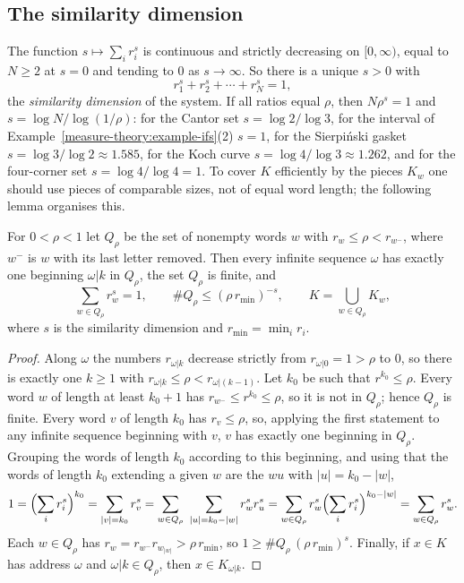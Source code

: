 \subsection{The similarity dimension}\label{measure-theory:subsection-similarity-dimension}

The function $s \mapsto \sum_ir_i^s$ is continuous and strictly decreasing on $[0, \infty)$, equal to $N \geq 2$ at $s = 0$ and tending to $0$ as $s \to \infty$. So there is a unique $s > 0$ with
\begin{equation}\label{measure-theory:equation-moran}
r_1^s + r_2^s + \cdots + r_N^s = 1,
\end{equation}
the \emph{similarity dimension} of the system. If all ratios equal $\rho$, then $N\rho^s = 1$ and $s = \log N/\log(1/\rho)$: for the Cantor set $s = \log 2/\log 3$, for the interval of
Example~\ref{measure-theory:example-ifs}(2) $s = 1$, for the Sierpi\'nski gasket $s = \log 3/\log 2 \approx 1.585$, for the Koch curve $s = \log 4/\log 3 \approx 1.262$, and for the
four-corner set $s = \log 4/\log 4 = 1$. To cover $K$ efficiently by the pieces $K_w$ one should use pieces of comparable sizes, not of equal word length; the following lemma organises this.

\begin{lemma}\label{measure-theory:lemma-cut-sets}
For $0 < \rho < 1$ let $Q_\rho$ be the set of nonempty words $w$ with $r_w \leq \rho < r_{w^-}$, where $w^-$ is $w$ with its last letter removed. Then every infinite sequence $\omega$ has exactly one
beginning $\omega|k$ in $Q_\rho$, the set $Q_\rho$ is finite, and
\[
\sum_{w \in Q_\rho}r_w^s = 1, \qquad \#Q_\rho \leq (\rho\,r_{\min})^{-s}, \qquad K = \bigcup_{w \in Q_\rho}K_w,
\]
where $s$ is the similarity dimension and $r_{\min} = \min_ir_i$.
\end{lemma}

\begin{proof}
Along $\omega$ the numbers $r_{\omega|k}$ decrease strictly from $r_{\omega|0} = 1 > \rho$ to $0$, so there is exactly one $k \geq 1$ with $r_{\omega|k} \leq \rho < r_{\omega|(k - 1)}$. Let $k_0$ be such
that $r^{k_0} \leq \rho$. Every word $w$ of length at least $k_0 + 1$ has $r_{w^-} \leq r^{k_0} \leq \rho$, so it is not in $Q_\rho$; hence $Q_\rho$ is finite. Every word $v$ of length $k_0$ has
$r_v \leq \rho$, so, applying the first statement to any infinite sequence beginning with $v$, $v$ has exactly one beginning in $Q_\rho$. Grouping the words of length $k_0$ according to this beginning,
and using that the words of length $k_0$ extending a given $w$ are the $wu$ with $|u| = k_0 - |w|$,
\[
1 = \Bigl(\sum_ir_i^s\Bigr)^{k_0} = \sum_{|v| = k_0}r_v^s = \sum_{w \in Q_\rho}\ \sum_{|u| = k_0 - |w|}r_w^sr_u^s = \sum_{w \in Q_\rho}r_w^s\Bigl(\sum_ir_i^s\Bigr)^{k_0 - |w|} = \sum_{w \in Q_\rho}r_w^s .
\]
Each $w \in Q_\rho$ has $r_w = r_{w^-}r_{w_{|w|}} > \rho\,r_{\min}$, so $1 \geq \#Q_\rho\,(\rho\,r_{\min})^s$. Finally, if $x \in K$ has address $\omega$ and $\omega|k \in Q_\rho$, then
$x \in K_{\omega|k}$.
\end{proof}


